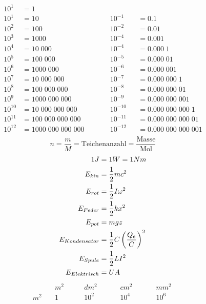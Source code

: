 \documentclass[twocolumn]{article}
\begin{document}
\begin{multicols}{2}


	\begin{alignat*}{3} 
	10^1 	&= 1 				  				  \\
	10^1 	&= 10	 			  &&10^{-1}		&&= 	0.1 \\
	10^2 	&= 100 			 	  &&10^{-2} 		&&= 	0.01 \\
	10^3 	&= 1000 		 	  &&10^{-4} 		&&= 	0.001 \\
	10^4 	&= 10\;000 		 	  &&10^{-4} 		&&= 	0.000\;1 \\
	10^5 	&= 100\;000 		 	  &&10^{-5} 		&&= 	0.000\;01 \\
	10^6 	&= 1000\;000 		 	  &&10^{-6} 		&&= 	0.000\;001 \\
	10^7 	&= 10\;000\;000 	 	  &&10^{-7} 		&&= 	0.000\;000\;1 \\
	10^8 	&= 100\;000\;000 	 	  &&10^{-8} 		&&= 	0.000\;000\;01 \\
	10^9 	&= 1000\;000\;000 	 	  &&10^{-9} 		&&= 	0.000\;000\;001 \\
	10^10 	&= 10\;000\;000\;000 	 	  &&10^{-10} 		&&= 	0.000\;000\;000\;1 \\
	10^11 	&= 100\;000\;000\;000 	 	  &&10^{-11} 		&&= 	0.000\;000\;000\;01 \\
	10^12 	&= 1000\;000\;000\;000	\qquad 	  &&10^{-12} 		&&= 	0.000\;000\;000\;001 \\
	\end{alignat*}
	\begin{equation*}
		n = \frac{m}{M} = \text{Teichenanzahl} = \frac{\text{Masse}}{\text{Mol}}
	\end{equation*}
\begin{align*}
	\LARGE 1J &= 1W = 1Nm \\
	\normalsize
	E_{kin} &= \frac{1}{2}mc^2 \\	
	E_{rot} &= \frac{1}{2}I\omega^2 \\
	E_{Feder} &= \frac{1}{2}kx^2 \\
	E_{pot} &= mgz \\
	E_{Kondensator} &= \frac{1}{2}C\left(\frac{Q_e}{C}\right)^2 \\
	E_{Spule}	&= \frac{1}{2}LI^2 \\
	E_{Elektrisch} & = UA \\
\end{align*}
	\begin{alignat*}{4} 
		&  m^2  &&\quad   dm^2 &&\quad   cm^2 &&\quad   mm^2 \\
		m^2 \quad	& 1\quad &&\quad 10^2\quad &&\quad 10^4\quad &&\quad 10^6\quad \\

\end{alignat*}
\end{multicols}
\end{document}
